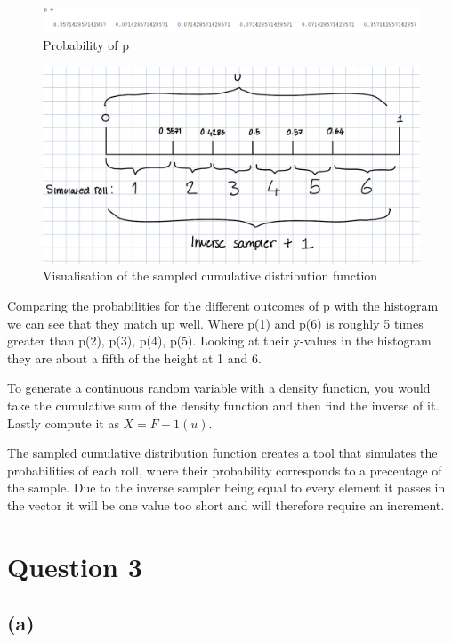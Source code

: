 \documentclass{article}
\begin{document}
    \begin{figure}[h]
        \includegraphics[width=\linewidth]{imgs/q2e_p.png}
        \caption{Probability of p}
    \end{figure}
    \hfill
    \begin{figure}[h]
        \includegraphics[width=\linewidth]{imgs/sampler.jpeg}
        \caption{Visualisation of the sampled cumulative distribution function}
    \end{figure}
    \hfill

Comparing the probabilities for the different outcomes of p with the histogram we can see that they match up well. Where p(1) and p(6) is roughly 5 times greater than p(2), p(3), p(4), p(5). 
Looking at their y-values in the histogram they are about a fifth of the height at 1 and 6.

To generate a continuous random variable with a density function, you would take the cumulative sum of the density function and then find the inverse of it. Lastly compute it as \(X = F - 1(u)\).

The sampled cumulative distribution function creates a tool that simulates the probabilities of each roll, where their probability corresponds to a precentage of the sample. Due to the inverse sampler being equal to every element it passes in the vector it will be one value too short and will therefore require an increment.

\newpage
\section{Question 3}

\subsection{(a)}
\end{document}
